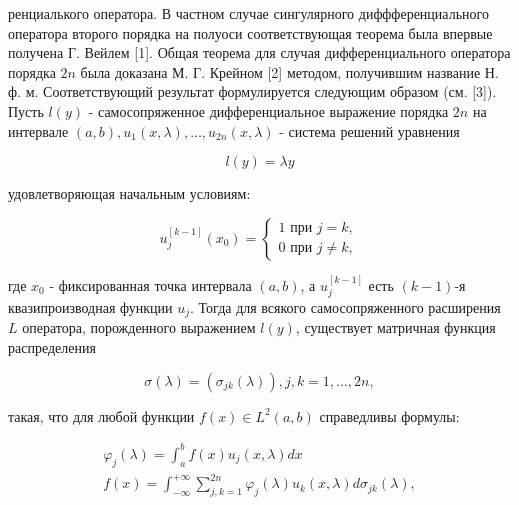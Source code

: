 \documentclass[10pt]{article}
\begin{document}
ренциалького оператора. В частном случае сингулярного диффференциального оператора второго порядка на полуоси соответствующая теорема была впервые получена Г. Вейлем [1]. Общая теорема для случая дифференциального оператора порядка $2 n$ была доказана М. Г. Крейном [2] методом, получившим название $Н$. ф. м. Соответствующий результат формулируется следующим образом (см. [3]). Пусть $l(y)$ - самосопряженное дифференциальное выражение порядка $2 n$ на интервале $(a, b), u_{1}(x, \lambda), \ldots, u_{2 n}(x, \lambda)$ - система решений уравнения



\[

l(y)=\lambda y

\]



удовлетворяющая начальным условиям:



\[

u_{j}^{[k-1]}\left(x_{0}\right)=\left\{\begin{array}{l}

1 \text { при } j=k, \\

0 \text { при } j \neq k,

\end{array}\right.

\]



где $x_{0}$ - фиксированная точка интервала $(a, b)$, а $u_{j}^{[k-1]}$ есть $(k-1)$-я квазипроизводная функции $u_{j}$. Тогда для всякого самосопряженного расширения $L$ оператора, порожденного выражением $l(y)$, существует матричная функция распределения



\[

\sigma(\lambda)=\left(\sigma_{j k}(\lambda)\right), j, k=1, \ldots, 2 n,

\]



такая, что для любой функции $f(x) \in L^{2}(a, b)$ справедливы формулы:



\[

\begin{gathered}

\varphi_{j}(\lambda)=\int_{a}^{b} f(x) u_{j}(x, \lambda) d x \\

f(x)=\int_{-\infty}^{+\infty} \sum_{j, k=1}^{2 n} \varphi_{j}(\lambda) u_{k}(x, \lambda) d \sigma_{j k}(\lambda),

\end{gathered}

\]
\end{document}
